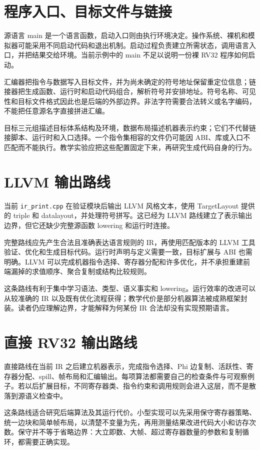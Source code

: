 \section{程序入口、目标文件与链接}
源语言 main 是一个语言函数，启动入口则由执行环境决定。操作系统、裸机和模拟器可能采用不同启动代码和退出机制。启动过程负责建立所需状态，调用语言入口，并把结果交给环境。当前示例中的 main 不足以说明一份裸 RV32 程序如何启动。

汇编器把指令与数据写入目标文件，并为尚未确定的符号地址保留重定位信息；链接器把生成函数、运行时和启动代码组合，解析符号并安排地址。符号名称、可见性和目标文件格式因此也是后端的外部边界。非法字符需要合法转义或名字编码，不能把任意源名字直接拼进汇编。

目标三元组描述目标体系结构及环境，数据布局描述机器表示约束；它们不代替链接脚本、运行时和入口选择。一个指令集相容的文件仍可能因 ABI、库或入口不匹配而不能执行。教学实验应把这些配置固定下来，再研究生成代码自身的行为。

\section{LLVM 输出路线}
当前 \texttt{ir\_print.cpp} 在验证模块后输出 LLVM 风格文本，使用 TargetLayout 提供的 triple 和 datalayout，并处理符号拼写。这已经为 LLVM 路线建立了表示输出边界，但它还缺少完整源函数 lowering 和运行时连接。

完整路线应先产生合法且准确表达语言规则的 IR，再使用匹配版本的 LLVM 工具验证、优化和生成目标代码。运行时声明与定义需要一致，目标扩展与 ABI 也需明确。LLVM 可以完成机器指令选择、寄存器分配和许多优化，并不承担重建前端漏掉的求值顺序、聚合复制或结构比较规则。

这条路线有利于集中学习语法、类型、语义事实和 lowering。运行效率的改进可以从较准确的 IR 以及既有优化流程获得；教学代价是部分机器算法被成熟框架封装。读者仍应理解边界，才能解释为何某份 IR 合法却没有实现预期语言。

\section{直接 RV32 输出路线}
直接路线在当前 IR 之后建立机器表示，完成指令选择、Phi 边复制、活跃性、寄存器分配、spill、帧布局和汇编输出。每项算法都需要自己的检查条件与可观察例子。若以后扩展目标，不同寄存器类、指令约束和调用规则会进入这层，而不是散落到源语义检查中。

这条路线适合研究后端算法及其运行代价。小型实现可以先采用保守寄存器策略、统一边块和简单帧布局，以清楚不变量为先，再用测量结果改进代码大小和访存次数。保守并不等于省略边界：大立即数、大帧、超过寄存器数量的参数和复制循环，都需要正确实现。

